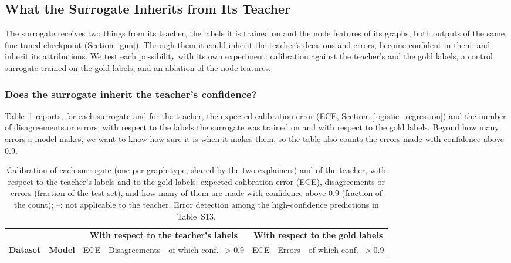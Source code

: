 \subsection{What the Surrogate Inherits from Its Teacher} \label{sec:calibration} \label{sec:ablation}

The surrogate receives two things from its teacher, the labels it is trained on and the node features of its graphs, both outputs of the same fine-tuned checkpoint (Section~\ref{gnn}). Through them it could inherit the teacher's decisions and errors, become confident in them, and inherit its attributions. We test each possibility with its own experiment: calibration against the teacher's and the gold labels, a control surrogate trained on the gold labels, and an ablation of the node features.

\subsubsection{Does the surrogate inherit the teacher's confidence?} \label{sec:inherit_conf}
Table~\ref{tab:calibration} reports, for each surrogate and for the teacher, the expected calibration error (ECE, Section~\ref{logistic_regression}) and the number of disagreements or errors, with respect to the labels the surrogate was trained on and with respect to the gold labels. Beyond how many errors a model makes, we want to know how sure it is when it makes them, so the table also counts the errors made with confidence above 0.9.

\begin{table}[H]
\centering
\scriptsize
\setlength{\tabcolsep}{4pt}
\caption{Calibration of each surrogate (one per graph type, shared by the two explainers) and of the teacher, with respect to the teacher's labels and to the gold labels: expected calibration error (ECE), disagreements or errors (fraction of the test set), and how many of them are made with confidence above 0.9 (fraction of the count); --: not applicable to the teacher. Error detection among the high-confidence predictions in Table~S13.}
\label{tab:calibration}
\begin{tabular}{@{}llcccccc@{}}
\toprule
& & \multicolumn{3}{c}{\textbf{With respect to the teacher's labels}} & \multicolumn{3}{c}{\textbf{With respect to the gold labels}} \\
\cmidrule(lr){3-5} \cmidrule(lr){6-8}
\textbf{Dataset} & \textbf{Model} & ECE & Disagreements & of which conf.\ \(>0.9\) & ECE & Errors & of which conf.\ \(>0.9\) \\
\midrule

\end{tabular}
\end{table}


